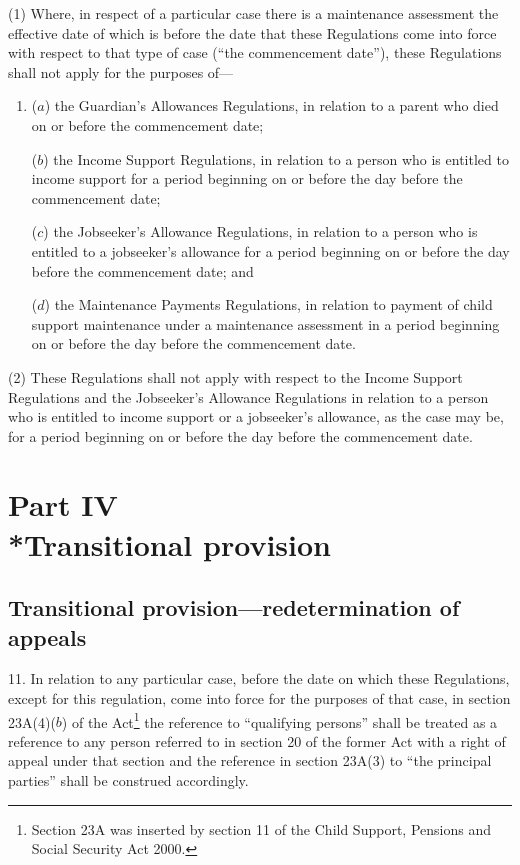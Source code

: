 \documentclass[12pt,a4paper]{article}
\begin{document}
(1)  Where, in respect of a particular case there is a maintenance assessment the effective date of which is before the date that these Regulations come into force with respect to that type of case (“the commencement date”), these Regulations shall not apply for the purposes of—
\begin{enumerate}\item[]
($a$) the Guardian’s Allowances Regulations, in relation to a parent who died on or before the commencement date;

($b$) the Income Support Regulations, in relation to a person who is entitled to income support for a period beginning on or before the day before the commencement date;

($c$) the Jobseeker’s Allowance Regulations, in relation to a person who is entitled to a jobseeker’s allowance for a period beginning on or before the day before the commencement date; and

($d$) the Maintenance Payments Regulations, in relation to payment of child support maintenance under a maintenance assessment in a period beginning on or before the day before the commencement date.
\end{enumerate}

(2) These Regulations shall not apply with respect to the Income Support Regulations and the Jobseeker’s Allowance Regulations in relation to a person who is entitled to income support or a jobseeker’s allowance, as the case may be, for a period beginning on or before the day before the commencement date.


\section[Part IV --- Transitional provision]{Part IV\\*Transitional provision}

\renewcommand\parthead{--- Part IV}

\subsection[11. Transitional provision—redetermination of appeals]{Transitional provision—redetermination of appeals}

11.  In relation to any particular case, before the date on which these Regulations, except for this regulation, come into force for the purposes of that case, in section 23A(4)($b$)  of the Act\footnote{Section 23A was inserted by section 11 of the Child Support, Pensions and Social Security Act 2000.} the reference to “qualifying persons” shall be treated as a reference to any person referred to in section 20 of the former Act with a right of appeal under that section and the reference in section 23A(3) to “the principal parties” shall be construed accordingly. 
\end{document}
